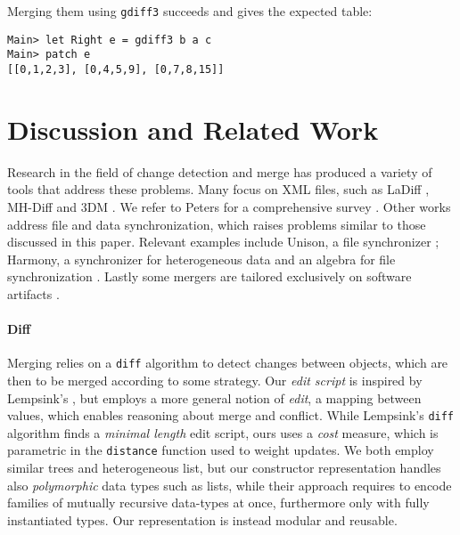 \documentclass{sigplanconf}
\theoremstyle{plain}
\begin{document}
Merging them using \texttt{gdiff3} succeeds and gives the expected table:
\begin{verbatim}
Main> let Right e = gdiff3 b a c
Main> patch e
[[0,1,2,3], [0,4,5,9], [0,7,8,15]]
\end{verbatim}




\section{Discussion and Related Work}
\label{sec:related-work}
Research in the field of change detection and merge has produced a
variety of tools that address these problems.  Many focus on XML
files, such as LaDiff \cite{Chawathe96}, MH-Diff \cite{Chawathe97} and
3DM \cite{Lind01, Lind04, Lind05}.  We refer to Peters for a
comprehensive survey \cite{PetersSurvey}.
%
Other works address file and data synchronization, which raises
problems similar to those discussed in this paper. Relevant examples
include Unison, a file synchronizer \cite{Pierce98, UnisonSpec};
Harmony, a synchronizer for heterogeneous data
\cite{HarmonyOverview,Pierce07} and an algebra for file
synchronization \cite{Ramsey01}.
%
Lastly some mergers are tailored exclusively on software artifacts
\cite{Westfechtel91, Mens02, Apel11}. 

\paragraph{Diff}
Merging relies on a \texttt{diff} algorithm to detect changes between
objects, which are then to be merged according to some strategy.
%
Our \emph{edit script} is inspired by Lempsink's \cite{Lemp09}, but
employs a more general notion of \emph{edit}, a mapping between
values, which enables reasoning about merge and conflict.
%
While Lempsink's \texttt{diff} algorithm finds a \emph{minimal length}
edit script, ours uses a \emph{cost} measure, which is parametric in
the \texttt{distance} function used to weight updates.  
%
We both employ similar trees and heterogeneous list, but our
constructor representation handles also \emph{polymorphic}
data types such as lists, while their approach requires 
to encode families of mutually recursive data-types
at once, furthermore only with fully instantiated types.
Our representation is instead modular and reusable.
\end{document}
